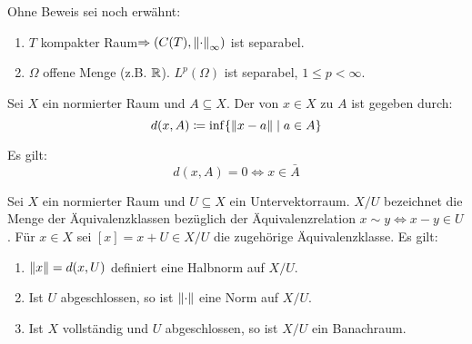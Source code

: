 \begin{bemerkung*}
	Ohne Beweis sei noch erw\"ahnt:
	\begin{enumerate}
		\item $ T $ kompakter Raum$ \Rightarrow(C(T),\left\|\cdot\right\|_\infty) $ ist separabel.
		\item $ \Omega $ offene Menge (z.B. $ \mathbb{R} $). $ L^p(\Omega) $ ist separabel, $ 1\leq p<\infty $.
	\end{enumerate}
\end{bemerkung*}
\begin{definition}
	Sei $ X $ ein normierter Raum und $ A\subseteq X $. Der   von $ x\in X $ zu $ A $ ist gegeben durch:
	\[ d(x,A)\coloneqq\inf\lbrace\left\|x-a\right\|\mid a\in A\rbrace \]
\end{definition}
\begin{bemerkung*}
 Es gilt: \[ d(x,A)=0\Leftrightarrow x\in\bar A \]
\end{bemerkung*}
\begin{satz}
	Sei $ X $ ein normierter Raum und $ U\subseteq X $ ein Untervektorraum. $ X/U $ bezeichnet die Menge der \"Aquivalenzklassen bez\"uglich der \"Aquivalenzrelation $ x\sim y\Leftrightarrow x-y\in U $. F\"ur $ x\in X $ sei $ [x]=x+U\in X/U $ die zugeh\"orige \"Aquivalenzklasse. Es gilt:
	\begin{enumerate}
		\item $ \left\|x\right\|=d(x,U) $ definiert eine Halbnorm auf $ X/U $.
		\item Ist $ U $ abgeschlossen, so ist $ \left\|\cdot\right\| $ eine Norm auf $ X/U $.
		\item Ist $ X $ vollst\"andig und $ U $ abgeschlossen, so ist $ X/U $ ein Banachraum.
	\end{enumerate}
\end{satz}

